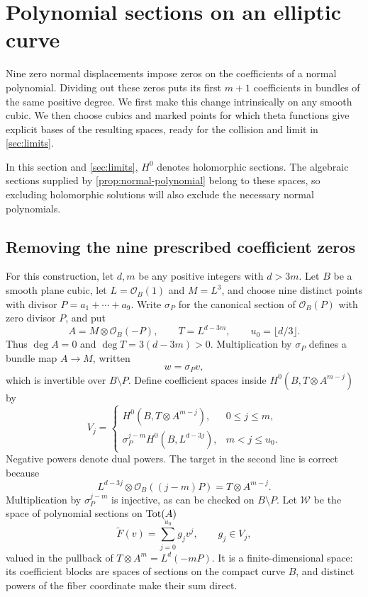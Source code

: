 \section{Polynomial sections on an elliptic curve}
\label{sec:elliptic}

Nine zero normal displacements impose zeros on the coefficients of a normal polynomial. Dividing out these zeros puts its first $m+1$ coefficients in bundles of the same positive degree. We first make this change intrinsically on any smooth cubic. We then choose cubics and marked points for which theta functions give explicit bases of the resulting spaces, ready for the collision and limit in \cref{sec:limits}.

In this section and \cref{sec:limits}, $H^0$ denotes holomorphic sections. The algebraic sections supplied by \cref{prop:normal-polynomial} belong to these spaces, so excluding holomorphic solutions will also exclude the necessary normal polynomials.

\subsection{Removing the nine prescribed coefficient zeros}

For this construction, let $d,m$ be any positive integers with $d>3m$. Let $B$ be a smooth plane cubic, let $L=\mathcal{O}_B(1)$ and $M=L^3$, and choose nine distinct points with divisor $P=a_1+\cdots+a_9$. Write $\sigma_P$ for the canonical section of $\mathcal{O}_B(P)$ with zero divisor $P$, and put
\[
 A=M\otimes\mathcal{O}_B(-P),\qquad
 T=L^{d-3m},\qquad u_0=\lfloor d/3\rfloor.
\]
Thus $\deg A=0$ and $\deg T=3(d-3m)>0$. Multiplication by $\sigma_P$ defines a bundle map $A\to M$, written
\[
 w=\sigma_P v,
\]
which is invertible over $B\setminus P$. Define coefficient spaces inside $H^0(B,T\otimes A^{m-j})$ by
\begin{equation}
 V_j=
 \begin{cases}
 H^0(B,T\otimes A^{m-j}),&0\leq j\leq m,\\[1mm]
 \sigma_P^{j-m}H^0(B,L^{d-3j}),&m<j\leq u_0.
 \end{cases}
\label{eq:coefficient-spaces}
\end{equation}
Negative powers denote dual powers. The target in the second line is correct because
\[
 L^{d-3j}\otimes\mathcal{O}_B((j-m)P)=T\otimes A^{m-j}.
\]
Multiplication by $\sigma_P^{j-m}$ is injective, as can be checked on $B\setminus P$. Let $\mathcal{W}$ be the space of polynomial sections on $\operatorname{Tot}(A)$
\[
 \widetilde F(v)=\sum_{j=0}^{u_0}g_jv^j,\qquad g_j\in V_j,
\]
valued in the pullback of $T\otimes A^m=L^d(-mP)$. It is a finite-dimensional space: its coefficient blocks are spaces of sections on the compact curve $B$, and distinct powers of the fiber coordinate make their sum direct.

